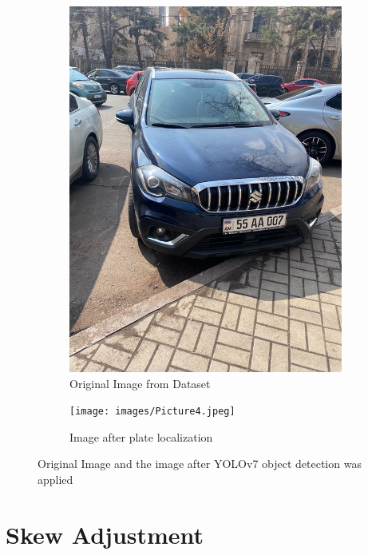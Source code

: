 \documentclass[conference]{IEEEtran}
\begin{document}
\begin{figure}[ht]
  \centering
  \begin{subfigure}[b]{0.45\linewidth}
    \includegraphics[width=\linewidth]{images/Picture3.png}
    \caption{Original Image from Dataset}
  \end{subfigure}
  \begin{subfigure}[b]{0.45\linewidth}
    \texttt{[image: images/Picture4.jpeg]}
    \caption{Image after plate localization}
  \end{subfigure}
  \caption{Original Image and the image after YOLOv7 object detection was applied}
  \label{fig:combined}
\end{figure}

\section{Skew Adjustment}
\end{document}
